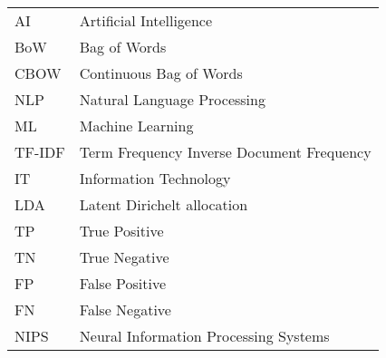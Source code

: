 \begin{longtable}{ll}

AI & Artificial Intelligence \\
BoW & Bag of Words \\
CBOW & Continuous Bag of Words \\
NLP & Natural Language Processing \\
ML & Machine Learning \\
TF-IDF & Term Frequency Inverse Document Frequency \\
IT & Information Technology \\
LDA & Latent Dirichelt allocation \\
TP & True Positive \\
TN & True Negative \\
FP & False Positive \\
FN & False Negative \\
NIPS & Neural Information Processing Systems \\

\end{longtable}

